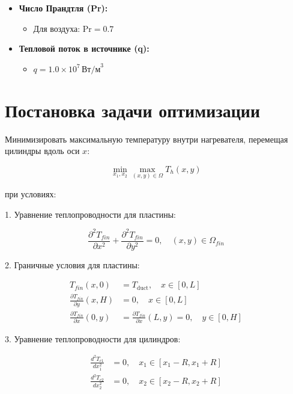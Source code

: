 \documentclass[a4paper,12pt]{extreport}
\numberwithin{equation}{chapter}
\begin{document}
\begin{itemize}
	\item \textbf{Число Прандтля (Pr):}
	      \begin{itemize}
		      \item Для воздуха: $\text{Pr} = 0.7$
	      \end{itemize}
	      
	\item \textbf{Тепловой поток в источнике (q):}
	      \begin{itemize}
		      \item $q = 1.0 \times 10^7 \, \text{Вт/м}^3$
	      \end{itemize}
\end{itemize}

\section{Постановка задачи оптимизации}

Минимизировать максимальную температуру внутри нагревателя, перемещая цилиндры вдоль оси $x$:

\begin{equation*}
	\min_{x_1, x_2} \max_{(x, y) \in \Omega} T_h(x, y)
\end{equation*}

при условиях:

1. Уравнение теплопроводности для пластины:

\begin{equation*}
	\frac{\partial^2 T_{fin}}{\partial x^2} + \frac{\partial^2 T_{fin}}{\partial y^2} = 0, \quad (x, y) \in \Omega_{fin}
\end{equation*}

2. Граничные условия для пластины:

\begin{align*}
	T_{fin}(x, 0)                             & = T_{\text{duct}}, \quad x \in [0, L]                               \\
	\frac{\partial T_{fin}}{\partial y}(x, H) & = 0, \quad x \in [0, L]                                             \\
	\frac{\partial T_{fin}}{\partial x}(0, y) & = \frac{\partial T_{fin}}{\partial x}(L, y) = 0, \quad y \in [0, H]
\end{align*}

3. Уравнение теплопроводности для цилиндров:

\begin{align*}
	\frac{d^2 T_{c1}}{dx_1^2} & = 0, \quad x_1 \in [x_1 - R, x_1 + R] \\
	\frac{d^2 T_{c2}}{dx_2^2} & = 0, \quad x_2 \in [x_2 - R, x_2 + R]
\end{align*}
\end{document}
